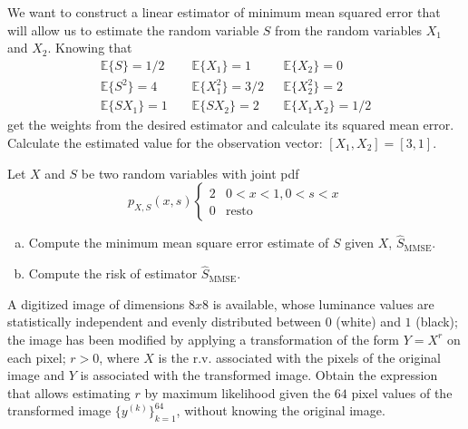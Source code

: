 \begin{prob}
We want to construct a linear estimator of minimum mean squared error that will allow us to estimate the random variable $S$ from the random variables $X_1$ and $X_2$. Knowing that
\begin{equation}
\begin{array}{lll} \mathbb{E}\{S\} = 1/2 & \mathbb{E}\{X_1\} = 1 & \mathbb{E}\{X_2\} = 0 \\ \mathbb{E}\{S^2\} = 4 & \mathbb{E}\{X_1^2\} = 3/2 & \mathbb{E}\{X_2^2\} = 2 \\ \mathbb{E}\{S X_1\} = 1 \;\;\;\;& \mathbb{E}\{S X_2\} = 2 \;\;\;\; & \mathbb{E}\{X_1 X_2\} = 1/2 \end{array}\nonumber
\end{equation}
get the weights from the desired estimator and calculate its squared mean error. Calculate the estimated value for the observation vector: $[X_1,X_2] = [3, 1]$.
\end{prob}


\begin{prob}
\label{ProbEstMSE+Sesgo}

Let $X$ and $S$ be two random variables with joint pdf
\[
p_{X,S}(x,s) \left \{ \begin{array}{ll} 2 & 0<x<1, 0<s<x\\ 0 & \mbox{resto} \end{array} \right.
\]
\begin{enumerate}[a)]
\item Compute the minimum mean square error estimate of $S$ given $X$, $\hat S_{\text{MMSE}}$.
\item Compute the risk of estimator $\hat S_\text{MMSE}$.
\end{enumerate}

\end{prob}


\begin{prob}
\label{ProbEstImagen}

A digitized image of dimensions $8x8$ is available, whose luminance values are statistically independent and evenly distributed between $0$ (white) and $1$ (black); the image has been modified by applying a transformation of the form $Y = X^r$ on each pixel; $r>0$, where $X$ is the r.v. associated with the pixels of the original image and $Y$ is associated with the transformed image. Obtain the expression that allows estimating $r$ by maximum likelihood given the $64$ pixel values of the transformed image $\{y^{(k)}\}_{k=1}^{64}$, without knowing the original image.

\end{prob}


